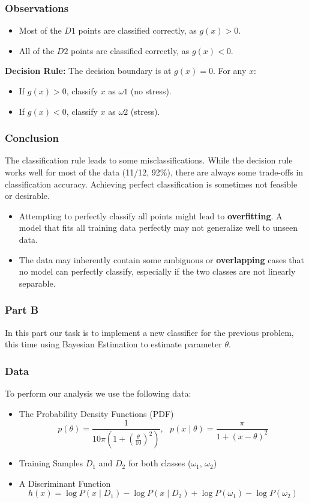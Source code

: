 \documentclass{beamer}
\begin{document}
\begin{frame}
\frametitle{Observations}
\begin{itemize}
    \item Most of the $D1$ points are classified correctly, as $g(x) > 0$.
    \item All of the $D2$ points are classified correctly, as $g(x) < 0$.
\end{itemize}
\vspace{1cm}
\textbf{Decision Rule:} The decision boundary is at $g(x) = 0$. For any $x$:
\begin{itemize}
    \item If $g(x) > 0$, classify $x$ as $ω1$ (no stress).
    \item If $g(x) < 0$, classify $x$ as $ω2$ (stress).
\end{itemize}
\end{frame}

\begin{frame}
\frametitle{Conclusion}
The classification rule leads to some misclassifications. While the decision rule works well for most of the data (11/12, 92\%), there are always some trade-offs in classification accuracy. Achieving perfect classification is sometimes not feasible or desirable.

\begin{itemize}
    \item Attempting to perfectly classify all points might lead to \textbf{overfitting}. A model that fits all training data perfectly may not generalize well to unseen data.
    \item The data may inherently contain some ambiguous or \textbf{overlapping} cases that no model can perfectly classify, especially if the two classes are not linearly separable.
\end{itemize}

\end{frame}


\begin{frame}
\frametitle{Part B}
In this part our task is to implement a new classifier for the previous problem, this time using Bayesian Estimation to estimate parameter $\theta$. 
\end{frame}

\begin{frame}
\frametitle{Data}

To perform our analysis we use the following data:
\begin{itemize}
    \item The Probability Density Functions (PDF)$$ p(\theta) = \frac{1}{10\pi \left( 1 + \left(\frac{\theta}{10}\right)^2 \right)}, \:\:\: p(x \mid \theta) = \frac{\pi}{1 + (x - \theta)^2} $$
    \item Training Samples $D_1$ and $D_2$ for both classes ($\omega_1$, $\omega_2$)
    \item A Discriminant Function $$ h(x) = \log P(x \mid D_1) - \log P(x \mid D_2) + \log P(\omega_1) - \log P(\omega_2) $$
\end{itemize}
\end{frame}
\end{document}
